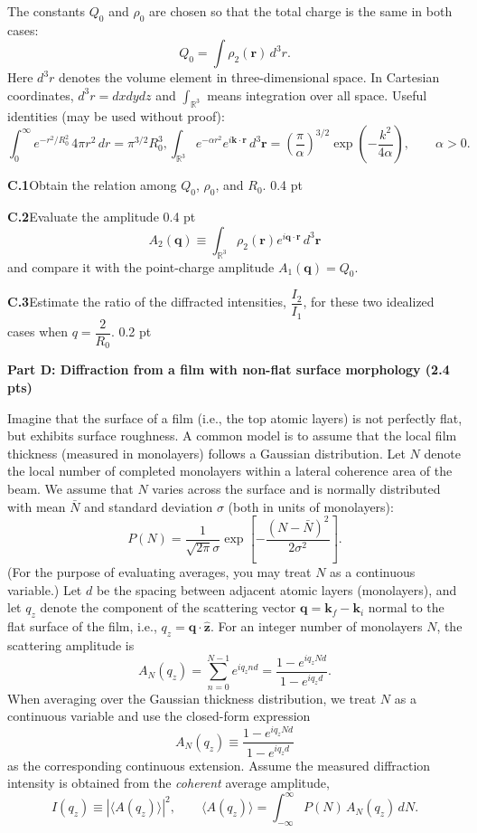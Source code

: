 The constants $Q_0$ and $\rho_0$ are chosen so that the total charge is the same
in both cases:
\[
Q_0 = \int \rho_2(\mathbf{r})\, d^3r.
\]
Here $d^3r$ denotes the volume element in three-dimensional space. In Cartesian
coordinates, $d^3r = dxdydz$ and $\int_{\mathbb{R}^3}$ means integration over all
space. Useful identities (may be used without proof):
\[
\int_0^\infty e^{-r^2/R_0^2}\, 4\pi r^2\, dr = \pi^{3/2}R_0^3, \int_{\mathbb{R}^3} e^{-\alpha r^2} e^{i\mathbf{k}\cdot\mathbf{r}}\, d^3\mathbf{r} = \left(\frac{\pi}{\alpha}\right)^{3/2} \exp\left(-\frac{k^2}{4\alpha}\right), \qquad \alpha > 0.
\]

\textbf{C.1}\quad Obtain the relation among $Q_0$, $\rho_0$, and $R_0$.
\hfill 0.4 pt

\textbf{C.2}\quad Evaluate the amplitude \hfill 0.4 pt
\[
A_2(\mathbf{q}) \equiv \int_{\mathbb{R}^3} \rho_2(\mathbf{r})e^{i\mathbf{q}\cdot\mathbf{r}}\, d^3\mathbf{r}
\]
and compare it with the point-charge amplitude $A_1(\mathbf{q}) = Q_0$.

\textbf{C.3}\quad Estimate the ratio of the diffracted intensities,
$\dfrac{I_2}{I_1}$, for these two idealized cases when $q = \dfrac{2}{R_0}$.
\hfill 0.2 pt

\textbf{Part D: Diffraction from a film with non-flat surface morphology (2.4 pts)}

Imagine that the surface of a film (i.e., the top atomic layers) is not
perfectly flat, but exhibits surface roughness. A common model is to assume
that the local film thickness (measured in monolayers) follows a Gaussian
distribution. Let $N$ denote the local number of completed monolayers within a
lateral coherence area of the beam. We assume that $N$ varies across the
surface and is normally distributed with mean $\bar{N}$ and standard deviation
$\sigma$ (both in units of monolayers):
\[
P(N) = \frac{1}{\sqrt{2\pi}\sigma} \exp\left[-\frac{(N - \bar{N})^2}{2\sigma^2}\right].
\]
(For the purpose of evaluating averages, you may treat $N$ as a continuous
variable.) Let $d$ be the spacing between adjacent atomic layers (monolayers),
and let $q_z$ denote the component of the scattering vector
$\mathbf{q} = \mathbf{k}_f - \mathbf{k}_i$ normal to the flat surface of the
film, i.e., $q_z = \mathbf{q}\cdot\hat{\mathbf{z}}$. For an integer number of
monolayers $N$, the scattering amplitude is
\[
A_N(q_z) = \sum_{n=0}^{N-1} e^{iq_z nd} = \frac{1 - e^{iq_z Nd}}{1 - e^{iq_z d}}.
\]
When averaging over the Gaussian thickness distribution, we treat $N$ as a
continuous variable and use the closed-form expression
\[
A_N(q_z) \equiv \frac{1 - e^{iq_z Nd}}{1 - e^{iq_z d}}
\]
as the corresponding continuous extension. Assume the measured diffraction
intensity is obtained from the \textit{coherent} average amplitude,
\[
I(q_z) \equiv \left|\langle A(q_z)\rangle\right|^2, \qquad \langle A(q_z)\rangle = \int_{-\infty}^{\infty} P(N)\, A_N(q_z)\, dN.
\]

